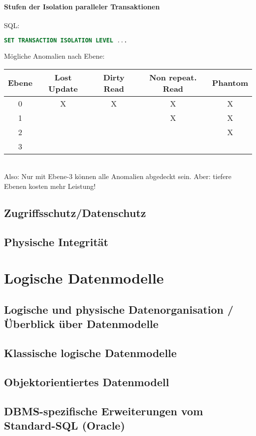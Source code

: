 \subsubsection{Stufen der Isolation paralleler Transaktionen}
SQL:
\begin{lstlisting}[language=SQL]
SET TRANSACTION ISOLATION LEVEL ...
\end{lstlisting}
Mögliche Anomalien nach Ebene:\\
\begin{tabular}{c | c | c | c | c}
Ebene & Lost Update & Dirty Read & Non repeat. Read & Phantom\\\hline
0 & X & X & X  & X\\
1 & & & X & X\\
2 & & & & X\\
3 &&&&\\
\end{tabular}\\
Also: Nur mit Ebene-3 können alle Anomalien abgedeckt sein. Aber: tiefere Ebenen kosten mehr Leistung!

\section{Zugriffsschutz/Datenschutz}
\section{Physische Integrität}

\chapter{Logische Datenmodelle}
\section{Logische und physische Datenorganisation / Überblick über Datenmodelle}
\section{Klassische logische Datenmodelle}
\section{Objektorientiertes Datenmodell}
\section{DBMS-spezifische Erweiterungen vom Standard-SQL (Oracle)}
